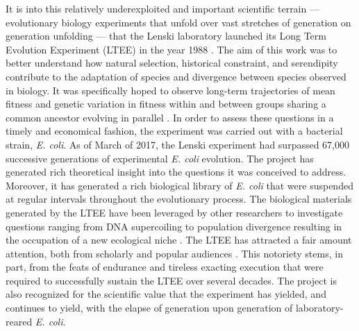 It is into this relatively underexploited and important scientific terrain --- evolutionary biology experiments that unfold over vast stretches of generation on generation unfolding --- that the Lenski laboratory launched its Long Term Evolution Experiment (LTEE) in the year 1988 \cite{Lenski2017TheSite}. 
The aim of this work was to better understand how natural selection, historical constraint, and serendipity contribute to the adaptation of species and divergence between species observed in biology.
It was specifically hoped to observe long-term trajectories of mean fitness and genetic variation in fitness within and between groups sharing a common ancestor evolving in parallel \cite{Lenski1991Long-TermGenerations}.
In order to assess these questions in a timely and economical fashion, the experiment was carried out with a bacterial strain, \textit{E. coli}.
As of March of 2017, the Lenski experiment had surpassed 67,000 successive generations of experimental \textit{E. coli} evolution.
The project has generated rich theoretical insight into the questions it was conceived to address.
Moreover, it has generated a rich biological library of \textit{E. coli} that were suspended at regular intervals throughout the evolutionary process.
The biological materials generated by the LTEE have been leveraged by other researchers to investigate questions ranging from DNA supercoiling \cite{Crozat2010ParallelColi} to population divergence resulting in the occupation of a new ecological niche \cite{Plucain2014EpistasisColi}.
The LTEE has attracted a fair amount attention, both from scholarly and popular audiences \cite{Dawkins2009TheEvolution, Zimmer2009MicrocosmLife, Zimmer2011TortoiseFlask, Lenski2016EvolutionaryLenski}.
This notoriety stems, in part, from the feats of endurance and tireless exacting execution that were required to successfully sustain the LTEE over several decades.
The project is also recognized for the scientific value that the experiment has yielded, and continues to yield, with the elapse of generation upon generation of laboratory-reared \textit{E. coli}.